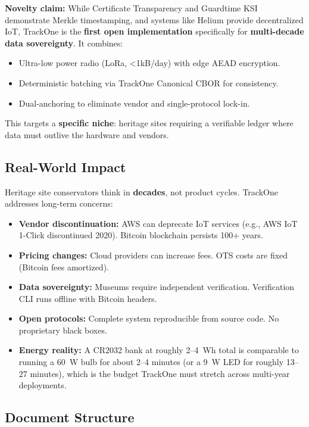     \textbf{Novelty claim:} While Certificate Transparency and Guardtime KSI demonstrate Merkle timestamping, and systems like Helium provide decentralized \ac{IoT}, TrackOne is the \textbf{first open implementation} specifically for \textbf{multi-decade data sovereignty}.
    It combines:
    \begin{itemize}[nosep]
        \item Ultra-low power radio (\ac{LoRa}, <1kB/day) with edge \ac{AEAD} encryption.
        \item Deterministic batching via TrackOne Canonical \ac{CBOR} for consistency.
        \item Dual-anchoring to eliminate vendor and single-protocol lock-in.
    \end{itemize}
    This targets a \textbf{specific niche}: heritage sites requiring a verifiable ledger where data must outlive the hardware and vendors.

\subsection{Real-World Impact}\label{subsec:real-world-impact}

Heritage site conservators think in \textbf{decades}, not product cycles.
TrackOne addresses long-term concerns:

\begin{itemize}[nosep]
    \item \textbf{Vendor discontinuation:} AWS can deprecate \ac{IoT} services (e.g., AWS \ac{IoT} 1-Click discontinued 2020).
    Bitcoin blockchain persists 100+ years.
    \item \textbf{Pricing changes:} Cloud providers can increase fees.
    \ac{OTS} costs are fixed (Bitcoin fees amortized).
    \item \textbf{Data sovereignty:} Museums require independent verification.
    Verification \ac{CLI} runs offline with Bitcoin headers.
    \item \textbf{Open protocols:} Complete system reproducible from source code.
    No proprietary black boxes.
    \item \textbf{Energy reality:} A CR2032 bank at roughly 2--4~Wh total is comparable to running a 60~W bulb for about 2--4 minutes (or a 9~W LED for roughly 13--27 minutes), which is the budget TrackOne must stretch across multi-year deployments.
\end{itemize}

\subsection{Document Structure}\label{subsec:document-structure}

